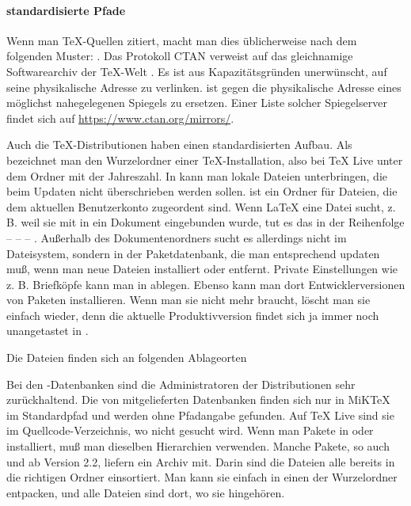 \documentclass[11pt,table]{scrreprt}
\begin{document}
\paragraph{standardisierte Pfade}
Wenn man \TeX-Quellen zitiert, macht man dies üblicherweise nach dem folgenden Muster: . Das Protokoll CTAN verweist auf das gleichnamige Softwarearchiv der \TeX-Welt . Es ist aus Kapazitätsgründen unerwünscht, auf seine physikalische Adresse zu verlinken.  ist gegen die physikalische Adresse eines möglichst nahegelegenen Spiegels zu ersetzen. Einer Liste solcher Spiegelserver findet sich auf \url{https://www.ctan.org/mirrors/}.

Auch die \TeX-Distributionen haben einen standardisierten Aufbau. Als  bezeichnet man den Wurzelordner einer \TeX-Installation, also bei \TeX{} Live unter dem Ordner mit der Jahreszahl. In  kann man lokale Dateien unterbringen, die beim Updaten nicht überschrieben werden sollen.  ist ein Ordner für Dateien, die dem aktuellen Benutzerkonto zugeordent sind. Wenn \LaTeX{} eine Datei sucht, z. B. weil sie mit  in ein Dokument eingebunden wurde, tut es das in der Reihenfolge  –  –  – . Außerhalb des Dokumentenordners sucht es allerdings nicht im Dateisystem, sondern in der Paketdatenbank, die man entsprechend updaten muß, wenn man neue Dateien installiert oder entfernt. Private Einstellungen wie z. B. Briefköpfe kann man in  ablegen. Ebenso kann man dort Entwicklerversionen von Paketen installieren. Wenn man sie nicht mehr braucht, löscht man sie einfach wieder, denn die aktuelle Produktivversion findet sich ja immer noch unangetastet in .

Die Dateien finden sich an folgenden Ablageorten

Bei den \BibTeX-Datenbanken sind die Administratoren der Distributionen sehr zurückhaltend. Die von \archbib{} mitgelieferten Datenbanken finden sich nur in MiK\TeX{} im Standardpfad und werden ohne Pfadangabe gefunden. Auf \TeX{} Live sind sie im Quellcode-Verzeichnis, wo nicht gesucht wird. Wenn man Pakete in  oder  installiert, muß man dieselben Hierarchien verwenden. Manche Pakete, so auch \blx{} und \archbib{} ab Version 2.2, liefern ein Archiv  mit. Darin sind die Dateien alle bereits in die richtigen Ordner einsortiert. Man kann sie einfach in einen der Wurzelordner entpacken, und alle Dateien sind dort, wo sie hingehören.
\end{document}
